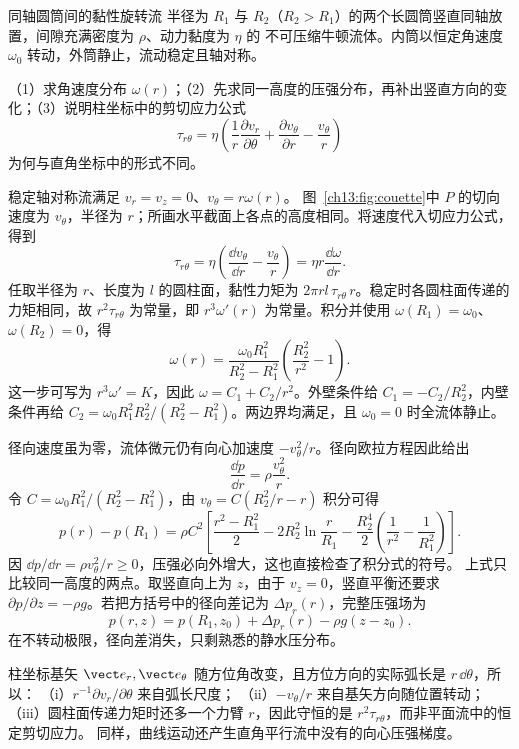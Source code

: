 \begin{origexamplebox}{同轴圆筒间的黏性旋转流}\label{ch13:ex:couette}
半径为 $R_1$ 与 $R_2$（$R_2>R_1$）的两个长圆筒竖直同轴放置，间隙充满密度为 $\rho$、动力黏度为 $\eta$ 的
不可压缩牛顿流体。内筒以恒定角速度 $\omega_0$ 转动，外筒静止，流动稳定且轴对称。

（1）求角速度分布 $\omega(r)$；（2）先求同一高度的压强分布，再补出竖直方向的变化；（3）说明柱坐标中的剪切应力公式
\[
 \tau_{r\theta}=\eta\left(\frac1r\frac{\partial v_r}{\partial\theta}
 +\frac{\partial v_\theta}{\partial r}-\frac{v_\theta}{r}\right)
\]
为何与直角坐标中的形式不同。

\FluidCouetteDiagram
\end{origexamplebox}
\begin{xesolution}
稳定轴对称流满足 $v_r=v_z=0$、$v_\theta=r\omega(r)$。
图~\ref{ch13:fig:couette}中 $P$ 的切向速度为 $v_\theta$，半径为 $r$；所画水平截面上各点的高度相同。将速度代入切应力公式，得到
\[
 \tau_{r\theta}=\eta\left(\frac{\dd v_\theta}{\dd r}-\frac{v_\theta}{r}\right)
 =\eta r\frac{\dd\omega}{\dd r}.
\]
任取半径为 $r$、长度为 $l$ 的圆柱面，黏性力矩为
$2\pi rl\,\tau_{r\theta}\,r$。稳定时各圆柱面传递的力矩相同，故
$r^2\tau_{r\theta}$ 为常量，即 $r^3\omega'(r)$ 为常量。积分并使用
$\omega(R_1)=\omega_0$、$\omega(R_2)=0$，得
\[
 \boxed{\omega(r)=\frac{\omega_0R_1^2}{R_2^2-R_1^2}
 \left(\frac{R_2^2}{r^2}-1\right)}.
\]
这一步可写为 $r^3\omega'=K$，因此 $\omega=C_1+C_2/r^2$。外壁条件给 $C_1=-C_2/R_2^2$，内壁条件再给
$C_2=\omega_0R_1^2R_2^2/(R_2^2-R_1^2)$。两边界均满足，且 $\omega_0=0$ 时全流体静止。

径向速度虽为零，流体微元仍有向心加速度 $-v_\theta^2/r$。径向欧拉方程因此给出
\[
 \frac{\dd p}{\dd r}=\rho\frac{v_\theta^2}{r}.
\]
令 $C=\omega_0R_1^2/(R_2^2-R_1^2)$，由
$v_\theta=C(R_2^2/r-r)$ 积分可得
\[
 \boxed{p(r)-p(R_1)=\rho C^2\left[
 \frac{r^2-R_1^2}{2}-2R_2^2\ln\frac r{R_1}
 -\frac{R_2^4}{2}\left(\frac1{r^2}-\frac1{R_1^2}\right)
 \right]}.
\]
因 $\dd p/\dd r=\rho v_\theta^2/r\ge0$，压强必向外增大，这也直接检查了积分式的符号。
上式只比较同一高度的两点。取竖直向上为 $z$，由于 $v_z=0$，竖直平衡还要求
$\partial p/\partial z=-\rho g$。若把方括号中的径向差记为 $\Delta p_r(r)$，完整压强场为
\[
 p(r,z)=p(R_1,z_0)+\Delta p_r(r)-\rho g(z-z_0).
\]
在不转动极限，径向差消失，只剩熟悉的静水压分布。

柱坐标基矢 $\vect e_r,\vect e_\theta$ 随方位角改变，且方位方向的实际弧长是 $r\,\dd\theta$，所以：
（i）$r^{-1}\partial v_r/\partial\theta$ 来自弧长尺度；
（ii）$-v_\theta/r$ 来自基矢方向随位置转动；
（iii）圆柱面传递力矩时还多一个力臂 $r$，因此守恒的是 $r^2\tau_{r\theta}$，而非平面流中的恒定剪切应力。
同样，曲线运动还产生直角平行流中没有的向心压强梯度。
\end{xesolution}

